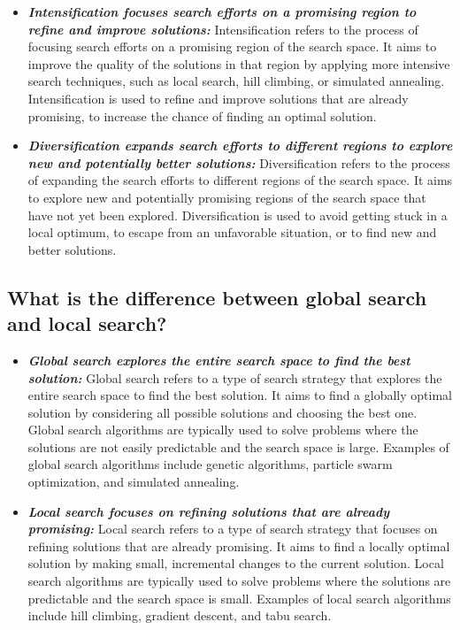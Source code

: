 \documentclass[conference]{IEEEtran}
\begin{document}
\begin{itemize}
	\item \textbf{\textit{Intensification focuses search efforts on a promising region to refine and improve solutions: }}Intensification refers to the process of focusing search efforts on a promising region of the search space. It aims to improve the quality of the solutions in that region by applying more intensive search techniques, such as local search, hill climbing, or simulated annealing. Intensification is used to refine and improve solutions that are already promising, to increase the chance of finding an optimal solution.
	\item \textbf{\textit{Diversification expands search efforts to different regions to explore new and potentially better solutions: }}Diversification refers to the process of expanding the search efforts to different regions of the search space. It aims to explore new and potentially promising regions of the search space that have not yet been explored. Diversification is used to avoid getting stuck in a local optimum, to escape from an unfavorable situation, or to find new and better solutions.
\end{itemize}

\subsection{What is the difference between global search and local search?}

\begin{itemize}
	\item \textbf{\textit{Global search explores the entire search space to find the best solution: }}Global search refers to a type of search strategy that explores the entire search space to find the best solution. It aims to find a globally optimal solution by considering all possible solutions and choosing the best one. Global search algorithms are typically used to solve problems where the solutions are not easily predictable and the search space is large. Examples of global search algorithms include genetic algorithms, particle swarm optimization, and simulated annealing.
	\item \textbf{\textit{Local search focuses on refining solutions that are already promising: }}Local search refers to a type of search strategy that focuses on refining solutions that are already promising. It aims to find a locally optimal solution by making small, incremental changes to the current solution. Local search algorithms are typically used to solve problems where the solutions are predictable and the search space is small. Examples of local search algorithms include hill climbing, gradient descent, and tabu search.
\end{itemize}
\end{document}
